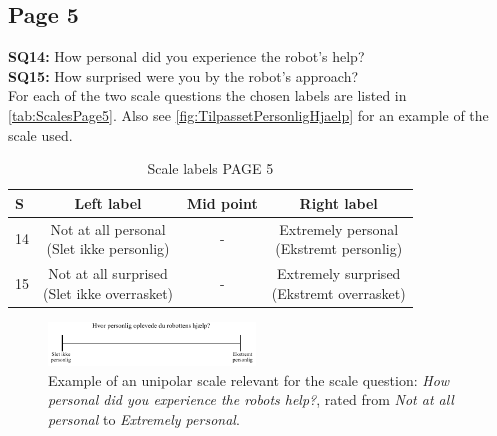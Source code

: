 \subsection{Page 5}
\noindent
\textbf{SQ14:} How personal did you experience the robot's help?\\%
\textbf{SQ15:} How surprised were you by the robot's approach?\\%
For each of the two scale questions the chosen labels are listed in \autoref{tab:ScalesPage5}. Also see \autoref{fig:TilpassetPersonligHjaelp} for an example of the scale used.
%
\begin{table}[H]
	\centering
\caption{Scale labels PAGE 5}
	\label{tab:ScalesPage5} 
	\begin{tabular}{l|c|c|c}
		S     & Left label & Mid point & Right label \\\hline
		14   & \makecell{Not at all personal\\(Slet ikke personlig)}  & - & \makecell{Extremely personal\\(Ekstremt personlig)}        \\\hline
		15   & \makecell{Not at all surprised\\(Slet ikke overrasket)} & - & \makecell{Extremely surprised \\(Ekstremt overrasket)}               
	\end{tabular}        
\end{table}
\noindent
%
\begin{figure}[H]
\centering
\includegraphics[width = 0.49\textwidth]{Figure/TilpassetPersonligHjaelp}
\setlength{} 
\caption{Example of an unipolar scale relevant for the scale question: \textit{How personal did you experience the robots help?}, rated from \textit{Not at all personal} to \textit{Extremely personal}.}
\label{fig:TilpassetPersonligHjaelp}
\end{figure}
\noindent
% 
